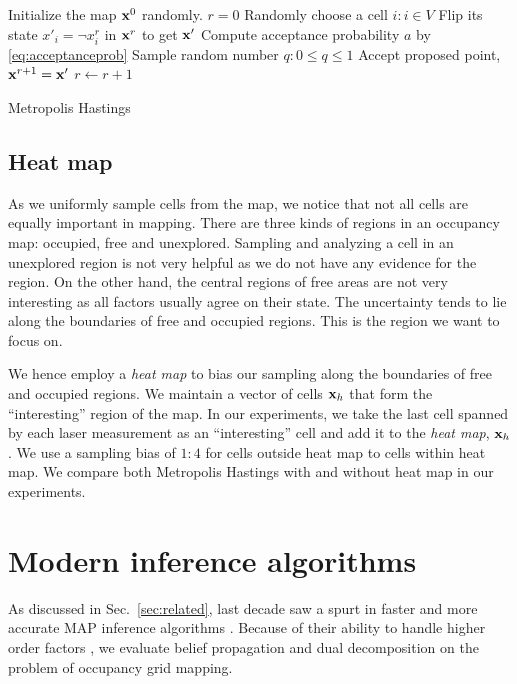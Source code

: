 \documentclass[letterpaper, 10 pt, conference]{ieeeconf} %
\begin{document}
% 
\begin{algorithm}
  Initialize the map $\mathbf{x}^0$ randomly.\;
  $r = 0$\;
   {
    Randomly choose a cell $i : i \in V$\;
    Flip its state $x'_i = \neg x^r_i$ in $\mathbf{x}^r$ to get $\mathbf{x}'$\;
    Compute acceptance probability $a$ by \eqref{eq:acceptanceprob}\;
    Sample random number $q : 0 \le q \le 1$\;
     {
      Accept proposed point, $\mathbf{x}^{r + 1} = \mathbf{x}'$\;
    } 
    $r \leftarrow r + 1$\;
  }
  \caption{Metropolis Hastings}
  \label{alg:metropolis}
\end{algorithm}

\subsection{Heat map}
As we uniformly sample cells from the map, we notice that not all
cells are equally important in mapping. There are three kinds of regions in an 
occupancy map: occupied, free and unexplored. Sampling and analyzing a cell in 
an
unexplored region is not very helpful as we do not have any evidence for the
region. On the other hand, the central regions of free areas are not very
interesting as all factors usually agree on their state. The uncertainty tends 
to lie
along the boundaries of free and occupied regions. This is the
region we want to focus on.

We hence employ a \emph{heat map} to bias our sampling along the boundaries of free
and occupied regions. We maintain a vector of cells $\mathbf{x}_h$ that form the
``interesting'' region of the map. In our experiments, we take the last cell
spanned by each laser measurement as an ``interesting'' cell and add it to the
\emph{heat map}, $\mathbf{x}_h$. We use a sampling bias of $1:4$ for cells
outside heat map to cells within heat map. We compare both Metropolis Hastings
with and without heat map in our experiments.

\section{Modern inference algorithms}
As discussed in Sec.~\ref{sec:related}, last decade saw a spurt in faster and
more accurate MAP inference algorithms \cite{kappes2013comparative}. Because of
their ability to handle higher order factors
\cite{potetz2007efficient,komodakis2009beyond}, we evaluate belief propagation
and dual decomposition on the problem of occupancy grid mapping.
\end{document}
